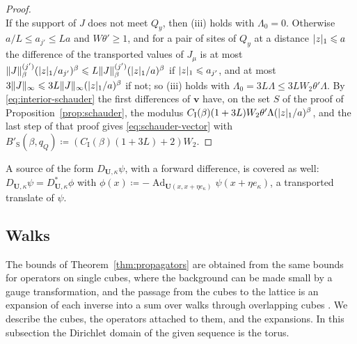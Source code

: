 \documentclass[11pt]{preprint}
\newcommand{\Ad}{\operatorname{Ad}}
\DeclarePairedDelimiter{\abs}{\lvert}{\rvert}
\DeclarePairedDelimiter{\norm}{\lVert}{\rVert}
\numberwithin{equation}{section}
\begin{document}
\begin{proof}
\[\]
If the support of $J$ does not meet $Q_y$, then (iii) holds with $\Lambda_0 = 0$. Otherwise $a/L \leqslant a_{j'} \leqslant La$ and $W\theta' \geqslant 1$, and for a pair of sites of $Q_y$ at a distance $\abs z_1 \leqslant a$ the difference of the transported values of $J_\mu$ is at most $\norm J^{(j')}_\beta(\abs z_1/a_{j'})^\beta \leqslant L\norm J^{(j')}_\beta(\abs z_1/a)^\beta$ if $\abs z_1 \leqslant a_{j'}$, and at most $3\norm J_\infty \leqslant 3L\norm J_\infty(\abs z_1/a)^\beta$ if not; so (iii) holds with $\Lambda_0 = 3L\Lambda \leqslant 3LW_2\theta'\Lambda$. By \eqref{eq:interior-schauder} the first differences of $\mathbf v$ have, on the set $S$ of the proof of Proposition~\ref{prop:schauder}, the modulus $C_{\mathrm I}(\beta)(1 + 3L)W_2\theta'\Lambda(\abs z_1/a)^\beta$, and the last step of that proof gives \eqref{eq:schauder-vector} with $B'_{\mathrm S}(\beta, q_Q) \coloneqq (C_{\mathrm I}(\beta)(1 + 3L) + 2)W_2$.
\end{proof}

A source of the form $D_{\mathbf U,\kappa}\psi$, with a forward difference, is covered as well: $D_{\mathbf U,\kappa}\psi = D^*_{\mathbf U,\kappa}\phi$ with $\phi(x) \coloneqq -\Ad_{\mathbf U(x, x + \eta e_\kappa)}\psi(x + \eta e_\kappa)$, a transported translate of $\psi$.

\subsection{Walks}\label{sec:walks}

The bounds of Theorem~\ref{thm:propagators} are obtained from the same bounds for operators on single cubes, where the background can be made small by a gauge transformation, and the passage from the cubes to the lattice is an expansion of each inverse into a sum over walks through overlapping cubes \cite[Sect.~C]{BalabanPBG}. We describe the cubes, the operators attached to them, and the expansions. In this subsection the Dirichlet domain of the given sequence is the torus.
\end{document}
